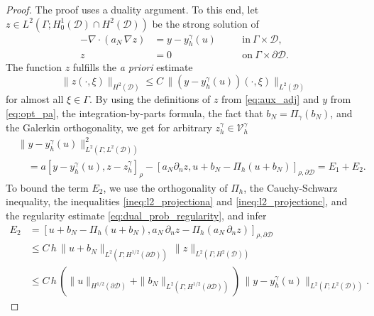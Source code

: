 \documentclass[10pt,a4paper]{amsart}
\newcommand{\cD}{{\mathcal{D}}}
\newcommand{\yL}{{L^2(\Gamma;L^2(\cD))}}
\begin{document}
\begin{proof}
The proof uses a duality argument. To this end, let $z\in L^2(\Gamma;H_0^1(\cD) \cap H^2(\cD))$ be the strong solution of
\begin{equation}
\begin{aligned} \label{eq:aux_adj}
	-\nabla\cdot(a_N \,\nabla z) &= y-y_h^\gamma(u) &\quad&\text{in}\ \Gamma\times \cD,\\
	z &= 0 && \text{on}\ \Gamma\times \partial\cD.
\end{aligned}
\end{equation}
The function $z$ fulfills the \emph{a priori} estimate
\begin{equation}
\label{eq:dual_prob_regularity}
	\|z(\cdot,\xi)\|_{H^2(\cD)} \le C\,\|(y-y_h^\gamma(u))(\cdot,\xi)\|_{L^2(\cD)}
\end{equation}
for almost all $\xi\in \Gamma$.
By using the definitions of $z$ from \eqref{eq:aux_adj} and $y$ from \eqref{eq:opt_pa}, the integration-by-parts formula, the fact that $b_N = \Pi_\gamma(b_N)$, and  the Galerkin orthogonality, we get for arbitrary $z_h^\gamma\in \mathcal V_h^\gamma$ 
\begin{align}\label{eq:FE_error_h1_splitting}
  &\|  y - y_h^{\gamma}(u) \|_{\yL}^2  \nonumber \\
  &\quad =a[y-y_h^\gamma(u), z-z_h^\gamma]_{\rho} - [a_N\partial_n z, u+b_N - \Pi_h(u+b_N)]_{\rho,\partial\cD}
    = E_1 + E_2.
\end{align}
To bound the term $E_2$, we use the orthogonality of $\Pi_h$, the Cauchy-Schwarz inequality, the inequalities \eqref{ineq:l2_projectiona} and \eqref{ineq:l2_projectionc}, and the regularity estimate \eqref{eq:dual_prob_regularity}, and infer
\begin{align}
\label{pr9}
  E_2 &= [u+b_N - \Pi_h(u+b_N), a_N\,\partial_n z - \Pi_h(a_N\,\partial_n z)]_{\rho,\partial\cD}
        \nonumber \\
      &\le C\,h\,\|u+b_N\|_{L^2(\Gamma;H^{1/2}(\partial\cD))}\, \|z\|_{L^2(\Gamma; H^2(\cD))}
        \nonumber \\
      &\le
        C\,h\,(\|u\|_{H^{1/2}(\partial\cD)} + \|b_N\|_{L^2(\Gamma; H^{1/2}(\partial\cD))})\,\|y-y_h^\gamma(u)\|_{L^2(\Gamma; L^2(\cD))}.
\end{align}


\end{proof}
\end{document}
